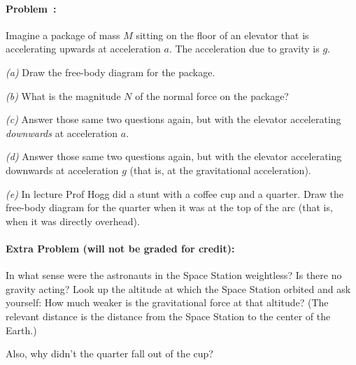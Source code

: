 \documentclass[12pt]{article}
\newcounter{problem}
\begin{document}
\paragraph{Problem~\theproblem:}%
Imagine a package of mass $M$ sitting on the floor of an elevator that
is accelerating upwards at acceleration $a$. The acceleration due to
gravity is $g$.

\textsl{(a)} Draw the free-body diagram for the package.

\textsl{(b)} What is the magnitude $N$ of the normal force on the
package?

\textsl{(c)} Answer those same two questions again, but with the
elevator accelerating \emph{downwards} at acceleration $a$.

\textsl{(d)} Answer those same two questions again, but with the
elevator accelerating downwards at acceleration $g$ (that is, at
the gravitational acceleration).

\textsl{(e)} In lecture Prof Hogg did a stunt with a coffee cup and a
quarter. Draw the free-body diagram for the quarter when it was at the
top of the arc (that is, when it was directly overhead).

\paragraph{Extra Problem (will not be graded for credit):}%
In what sense were the astronauts in the Space Station weightless? Is
there no gravity acting? Look up the altitude at which the Space
Station orbited and ask yourself: How much weaker is the gravitational
force at that altitude? (The relevant distance is the distance from
the Space Station to the center of the Earth.)

Also, why didn't the quarter fall out of the cup?
\end{document}
